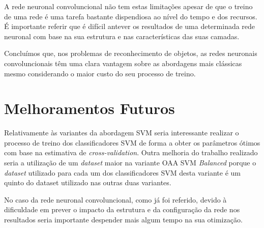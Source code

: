 \documentclass[extendedabs]{vcom}
\begin{document}
A rede neuronal convoluncional não tem estas limitações apesar de que o treino de uma rede é uma tarefa bastante dispendiosa ao nível do tempo e dos recursos. É importante referir que é difícil antever os resultados de uma determinada rede neuronal com base na sua estrutura e nas características das suas camadas.

Concluímos que, nos problemas de reconhecimento de objetos, as redes neuronais convoluncionais têm uma clara vantagem sobre as abordagens mais clássicas mesmo considerando o maior custo do seu processo de treino.

\section{Melhoramentos Futuros}
Relativamente às variantes da abordagem SVM seria interessante realizar o processo de treino dos classificadores SVM de forma a obter os parâmetros ótimos com base na estimativa de \textit{cross-validation}. Outra melhoria do trabalho realizado seria a utilização de um \textit{dataset} maior na variante OAA SVM \textit{Balanced} porque o \textit{dataset} utilizado para cada um dos classificadores SVM desta variante é um quinto do dataset utilizado nas outras duas variantes. 

No caso da rede neuronal convoluncional, como já foi referido, devido à dificuldade em prever o impacto da estrutura e da configuração da rede nos resultados seria importante despender mais algum tempo na sua otimização.  

\nocite{*}


\end{document}
